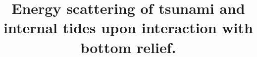 



\title{Energy scattering of tsunami and internal tides upon interaction with bottom relief.}
\maketitle

